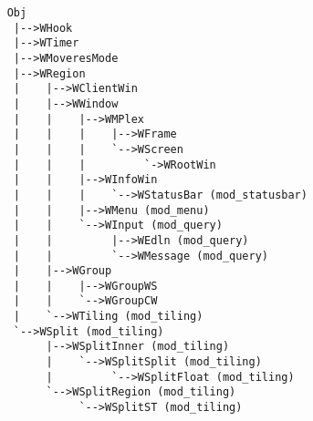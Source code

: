 \label{app:fullhierarchy}
  
{\small
\begin{verbatim}
    Obj
     |-->WHook
     |-->WTimer
     |-->WMoveresMode
     |-->WRegion
     |    |-->WClientWin
     |    |-->WWindow
     |    |    |-->WMPlex
     |    |    |    |-->WFrame
     |    |    |    `-->WScreen
     |    |    |         `->WRootWin
     |    |    |-->WInfoWin
     |    |    |    `-->WStatusBar (mod_statusbar)
     |    |    |-->WMenu (mod_menu)
     |    |    `-->WInput (mod_query)
     |    |         |-->WEdln (mod_query)
     |    |         `-->WMessage (mod_query)
     |    |-->WGroup
     |    |    |-->WGroupWS
     |    |    `-->WGroupCW
     |    `-->WTiling (mod_tiling)
     `-->WSplit (mod_tiling)
          |-->WSplitInner (mod_tiling)
          |    `-->WSplitSplit (mod_tiling)
          |         `-->WSplitFloat (mod_tiling)
          `-->WSplitRegion (mod_tiling)
               `-->WSplitST (mod_tiling)
\end{verbatim}
}
